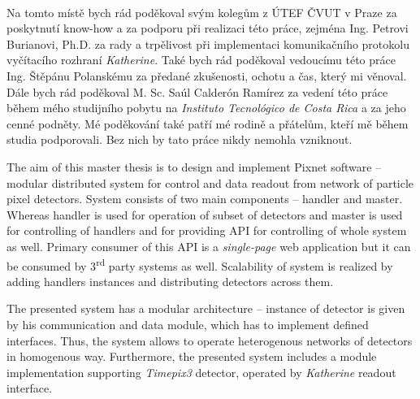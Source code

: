 \documentclass[11pt,twoside,a4paper]{book}
\begin{document}
	\translate				%


	\coverpagestarts

	\newpage~
	
	
	\newpage

	\acknowledgements
	\noindent
	Na tomto místě bych rád poděkoval svým kolegům z ÚTEF ČVUT v Praze za poskytnutí know-how a za podporu při realizaci této práce, zejména Ing. Petrovi Burianovi, Ph.D. za rady a trpělivost při implementaci komunikačního protokolu vyčítacího rozhraní \textit{Katherine}. Také bych rád poděkoval vedoucímu této práce Ing. Štěpánu Polanskému za předané zkušenosti, ochotu a čas, který mi věnoval. Dále bych rád poděkoval M. Sc. Saúl Calderón Ramírez za vedení této práce během mého studijního pobytu na \textit{Instituto Tecnológico de Costa Rica} a za jeho cenné podněty. Mé poděkování také patří mé rodině a přátelům, kteří mě během studia podporovali. Bez nich by tato práce nikdy nemohla vzniknout.





 
	\abstractpage
	The aim of this master thesis is to design and implement Pixnet software -- modular distributed system for control and data readout from network of particle pixel detectors. System consists of two main components -- handler and master. Whereas handler is used for operation of subset of detectors and master is used for controlling of handlers and for providing API for controlling of whole system as well. Primary consumer of this API is a \textit{single-page} web application but it can be consumed by 3\textsuperscript{rd} party systems as well. Scalability of system is realized by adding handlers instances and distributing detectors across them.

	The presented system has a modular architecture -- instance of detector is given by his communication and data module, which has to implement defined interfaces. Thus, the system allows to operate heterogenous networks of detectors in homogenous way. Furthermore, the presented system includes a module implementation supporting \textit{Timepix3} detector, operated by \textit{Katherine} readout interface.
	
\end{document}
